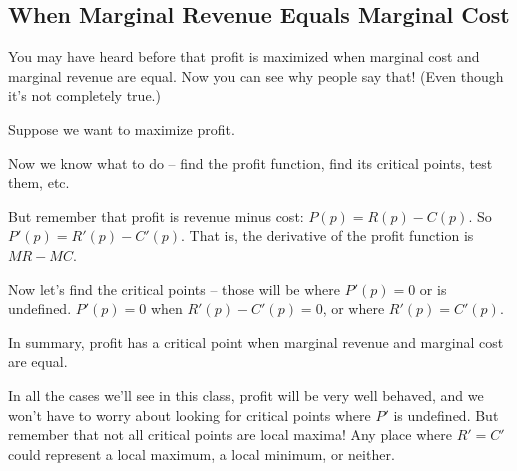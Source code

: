 \subsection{When Marginal Revenue Equals Marginal Cost}
You may have heard before that profit is maximized when marginal cost and marginal revenue are equal. Now you can see why people say that! (Even though it's not completely true.)

\begin{example}
Suppose we want to maximize profit.

\begin{solution} Now we know what to do -- find the profit function, find its critical points, test them, etc.

But remember that profit is revenue minus cost: $P(p) = R(p) - C(p)$. So $P'(p) = R'(p)-C'(p)$. That is, the derivative of the profit function is $MR-MC$.

Now let's find the critical points -- those will be where $P'(p) = 0$ or is undefined. $P'(p) = 0$ when $R'(p)-C'(p)=0$, or where $R'(p)=C'(p)$.

In summary, profit has a critical point when marginal revenue and marginal cost are equal.
\end{solution}\end{example}

In all the cases we'll see in this class, profit will be very well behaved, and we won't have to worry about looking for critical points where $P'$ is undefined. But remember that not all critical points are local maxima! Any place where $R'=C'$ could represent a local maximum, a local minimum, or neither.

